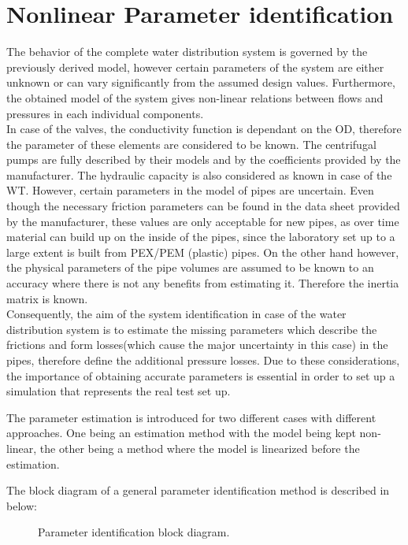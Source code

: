 \section{Nonlinear Parameter identification}
\label{SubSecEstimation}

The behavior of the complete water distribution system is governed by the previously derived model, however certain parameters of the system are either unknown or can vary significantly from the assumed design values. Furthermore, the obtained model of the system gives non-linear relations between flows and pressures in each individual components. 
\\
In case of the valves, the conductivity function is dependant on the OD, therefore the parameter of these elements are considered to be known. The centrifugal pumps are fully described by their models and by the coefficients provided by the manufacturer. The hydraulic capacity is also considered as known in case of the WT. However, certain parameters in the model of pipes are uncertain. Even though the necessary friction parameters can be found in the data sheet provided by the manufacturer, these values are only acceptable for new pipes, as over time material can build up on the inside of the pipes, since the laboratory set up to a large extent is built from PEX/PEM (plastic) pipes. On the other hand however, the physical parameters of the pipe volumes are assumed to be known to an accuracy where there is not any benefits from estimating it. Therefore the inertia matrix is known.  
\\
Consequently, the aim of the system identification in case of the water distribution system is to estimate the missing parameters which describe the frictions and form losses(which cause the major uncertainty in this case) in the pipes, therefore define the additional pressure losses. Due to these considerations, the importance of obtaining accurate parameters is essential in order to set up a simulation that represents the real test set up. 

The parameter estimation is introduced for two different cases with different approaches. One being an estimation method with the model being kept non-linear, the other being a method where the model is  linearized before the estimation. 

The block diagram of a general parameter identification method is described in  below: 

\begin{figure}[H]
\centering
 
\caption{Parameter identification block diagram. }
\label{fig:parame_block}
\end{figure}

